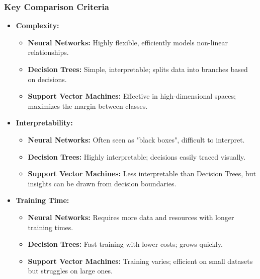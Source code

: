 \documentclass[aspectratio=169]{beamer}
\begin{document}
\begin{frame}[fragile]
    \frametitle{Key Comparison Criteria}
    \begin{itemize}
        \item \textbf{Complexity:}
            \begin{itemize}
                \item \textbf{Neural Networks:} Highly flexible, efficiently models non-linear relationships.
                \item \textbf{Decision Trees:} Simple, interpretable; splits data into branches based on decisions.
                \item \textbf{Support Vector Machines:} Effective in high-dimensional spaces; maximizes the margin between classes.
            \end{itemize}
        
        \item \textbf{Interpretability:}
            \begin{itemize}
                \item \textbf{Neural Networks:} Often seen as "black boxes", difficult to interpret.
                \item \textbf{Decision Trees:} Highly interpretable; decisions easily traced visually.
                \item \textbf{Support Vector Machines:} Less interpretable than Decision Trees, but insights can be drawn from decision boundaries.
            \end{itemize}
        
        \item \textbf{Training Time:}
            \begin{itemize}
                \item \textbf{Neural Networks:} Requires more data and resources with longer training times.
                \item \textbf{Decision Trees:} Fast training with lower costs; grows quickly.
                \item \textbf{Support Vector Machines:} Training varies; efficient on small datasets but struggles on large ones.
            \end{itemize}
    \end{itemize}
\end{frame}
\end{document}

